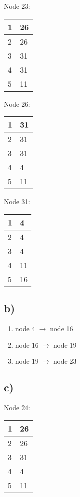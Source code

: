 \documentclass{scrartcl}
\begin{document}
	\begin{minipage}[t]{.25\linewidth}
		\centering
        Node 23:\\
		\begin{tabular}{|l|l|}
			\hline
			1 & 26 \\ \hline
			2 & 26 \\ \hline
			3 & 31 \\ \hline
			4 & 31 \\ \hline
			5 & 11 \\ \hline
		\end{tabular}
	\end{minipage}%
	\begin{minipage}[t]{.25\linewidth}
		\centering
        Node 26:\\
		\begin{tabular}{|l|l|}
			\hline
			1 & 31 \\ \hline
			2 & 31 \\ \hline
			3 & 31 \\ \hline
			4 & 4 \\ \hline
			5 & 11 \\ \hline
		\end{tabular}
	\end{minipage}
	\begin{minipage}[t]{.25\linewidth}
		\centering
        Node 31:\\
		\begin{tabular}{|l|l|}
			\hline
			1 & 4 \\ \hline
			2 & 4 \\ \hline
			3 & 4 \\ \hline
			4 & 11 \\ \hline
			5 & 16 \\ \hline
		\end{tabular}
	\end{minipage}


\subsection*{b)}
\begin{enumerate}
	\item node 4 $ \rightarrow $ node 16
	\item node 16 $ \rightarrow $ node 19
	\item node 19 $ \rightarrow $ node 23
\end{enumerate}


\subsection*{c)}
\begin{minipage}[t]{.25\linewidth}
	\centering
    Node 24:\\
	\begin{tabular}{|l|l|}
		\hline
		1 & 26 \\ \hline
		2 & 26 \\ \hline
		3 & 31 \\ \hline
		4 & 4 \\ \hline
		5 & 11 \\ \hline
	\end{tabular}
\end{minipage}
\end{document}
